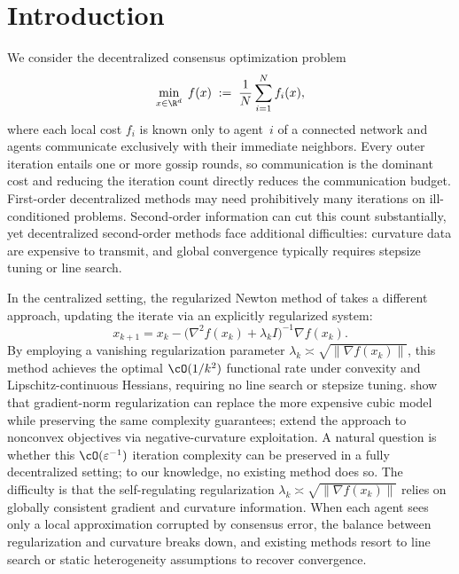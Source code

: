 \documentclass[review,onefignum,onetabnum]{siamart171218}
\begin{document}
	\section{Introduction}\label{sec:intro}
	We consider the decentralized consensus optimization problem
	\begin{equation}\label{eq:intro_prob}
		\min_{x\in\R^d}\; f(x)\;:=\;\frac{1}{N}\sum_{i=1}^N f_i(x),
	\end{equation}
	where each local cost $f_i$ is known only to agent~$i$ of a
	connected network and agents communicate exclusively with their
	immediate neighbors.
	Every outer iteration entails one or more gossip rounds, so
	communication is the dominant cost and
	reducing the iteration count directly reduces
	the communication budget.
	First-order decentralized methods may need prohibitively many
	iterations on ill-conditioned problems.
	Second-order information can cut this count substantially, yet
	decentralized second-order methods face additional difficulties:
	curvature data are expensive to transmit, and global convergence
	typically requires stepsize tuning or line search.

	In the centralized setting, the regularized Newton method of
	\citet{mishchenko2023rn} takes a different approach, updating
	the iterate via an explicitly regularized system:
	\[
	x_{k+1} = x_k - \bigl(\nabla^2 f(x_k) + \lambda_k I\bigr)^{-1} \nabla f(x_k).
	\]
	By employing a vanishing regularization parameter
	$\lambda_k\asymp\sqrt{\|\nabla f(x_k)\|}$, this method achieves
	the optimal $\cO(1/k^2)$ functional rate under convexity
	and Lipschitz-continuous Hessians, requiring no line search or
	stepsize tuning.
	\citet{doikov2024gradient} show that gradient-norm regularization
	can replace the more expensive cubic model
	\citep{nesterov2006cubic,cartis2011arc} while preserving the
	same complexity guarantees;
	\citet{ding2025nonconvex} extend the approach to nonconvex
	objectives via negative-curvature exploitation.
	A natural question is whether this
	$\cO(\varepsilon^{-1})$ iteration complexity can be preserved
	in a fully decentralized setting;
	to our knowledge, no existing method does so.
	The difficulty is that the self-regulating regularization
	$\lambda_k\asymp\sqrt{\|\nabla f(x_k)\|}$ relies on globally
	consistent gradient and curvature information.
	When each agent sees only a local approximation corrupted
	by consensus error, the balance between regularization and curvature
	breaks down, and existing methods resort to line search or static
	heterogeneity assumptions to recover convergence.
\end{document}
